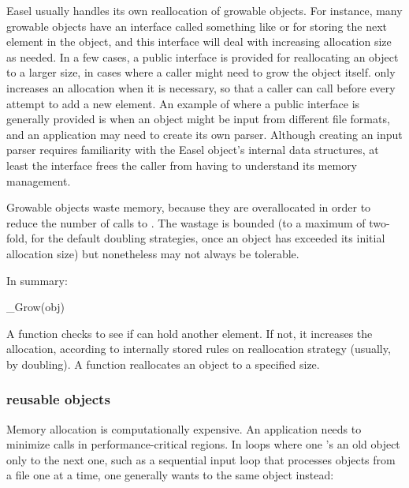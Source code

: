 Easel usually handles its own reallocation of growable objects. For
instance, many growable objects have an interface called something
like  or  for storing the next element
in the object, and this interface will deal with increasing allocation
size as needed.  In a few cases, a public  interface
is provided for reallocating an object to a larger size, in cases
where a caller might need to grow the object itself. 
only increases an allocation when it is necessary, so that a caller
can call  before every attempt to add a new
element. An example of where a public  interface is
generally provided is when an object might be input from different
file formats, and an application may need to create its own
parser. Although creating an input parser requires familiarity with
the Easel object's internal data structures, at least the
 interface frees the caller from having to understand
its memory management.

Growable objects waste memory, because they are overallocated in order
to reduce the number of calls to .  The wastage is
bounded (to a maximum of two-fold, for the default doubling
strategies, once an object has exceeded its initial allocation size)
but nonetheless may not always be tolerable. 

In summary: 

\begin{sreapi}
\hypertarget{ifc:Grow}
{\item[\_Grow(obj)]}

A  function checks to see if  can hold
another element. If not, it increases the allocation, according to
internally stored rules on reallocation strategy (usually, by
doubling). A  function reallocates an object to a
specified size.
\end{sreapi}

  \subsubsection{reusable objects}

Memory allocation is computationally expensive. An application needs
to minimize  calls in performance-critical
regions. In loops where one 's an old object only
to  the next one, such as a sequential input loop
that processes objects from a file one at a time, one generally wants
to  the same object instead:

